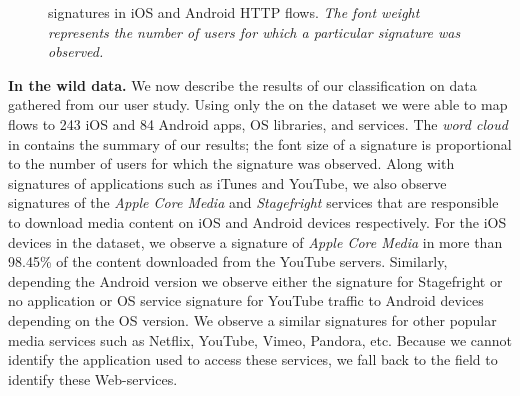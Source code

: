 \begin{figure}
\newline
{}
\caption{\useragent signatures in  iOS and Android HTTP flows. \emph{The font weight represents the number of users for which a particular signature was observed.}}
\label{fig:http-wordcloud}
\end{figure}

\textbf{In the wild data.}
We now describe the results of our classification on data gathered from our user study.
Using only the \useragent on the \mobWild dataset we were able to map flows to 243 iOS and 84 Android apps, OS libraries, and services. 
The \emph{word cloud} in  contains the summary of our results; the font size of a signature is proportional to the number of users for which the signature was observed.
Along with signatures of applications such as iTunes and YouTube, we also observe signatures of the \emph{Apple Core Media} and \emph{Stagefright} services that are responsible to download media content on iOS and Android devices respectively.
For the iOS devices in the \mobWild dataset, we observe a signature of \emph{Apple Core Media} in more than 98.45\% of the content downloaded from the YouTube servers.
Similarly, depending the Android version we observe either the signature for Stagefright\cite{android:stagefright} or no application or OS service signature for YouTube traffic to Android devices depending on the OS version. 
We observe a similar signatures for other popular media services such as Netflix, YouTube, Vimeo, Pandora, etc.
Because we cannot identify the application used to access these services, we fall back to the \httphost field to identify these Web-services.

